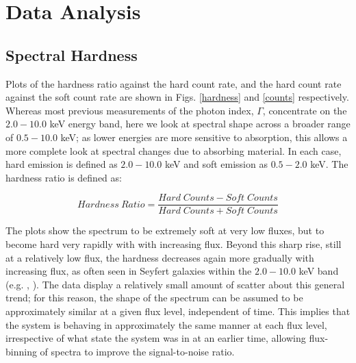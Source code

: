 \documentclass[useAMS,usenatbib]{sam}
\begin{document}
\section{Data Analysis}

\subsection{Spectral Hardness}

Plots of the hardness ratio against the hard count rate, and the hard count rate against the soft count rate are shown in Figs. \ref{hardness} and \ref{counts}
respectively. Whereas most previous measurements of the photon index, $\Gamma$, concentrate on the $2.0-10.0$ keV energy band, here we look at spectral shape across a
broader range of $0.5-10.0$ keV; as lower energies are more sensitive to absorption, this allows a more complete look at spectral changes due to absorbing material. In
each case, hard emission is defined as $2.0 - 10.0$ keV and soft emission as $0.5-2.0$ keV. The hardness ratio is defined as: 

\begin{equation*}
Hardness\ Ratio = \frac{Hard\;Counts - Soft\;Counts}{Hard\;Counts + Soft\;Counts}
\end{equation*}
\hspace{0.5cm}
 
 The plots show the spectrum to be extremely soft at very low fluxes, but to become hard very rapidly with with increasing flux. Beyond this sharp rise, still at a
relatively low flux, the hardness decreases again more gradually with increasing flux, as often seen in Seyfert galaxies within the $2.0-10.0$ keV band (e.g.
\citet{sobolewska}, \citet{lamer}). The data display a relatively small amount of scatter about this general trend; for this reason, the shape of the spectrum can be
assumed to be approximately similar at a given flux level, independent of time. This implies that the system is behaving in approximately the same manner at each flux
level, irrespective of what state the system was in at an earlier time, allowing flux-binning of spectra to improve the signal-to-noise ratio.
\end{document}
